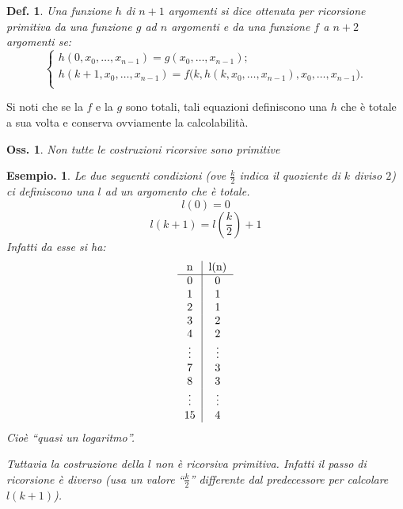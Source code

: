 \documentclass{book}
\newtheorem{definizione}{Def.}[chapter]
\newtheorem{osservazione}{Oss.}[chapter]
\newtheorem{esempio}{Esempio.}
\begin{document}
\begin{definizione}
Una funzione $h$ di $n + 1$ argomenti si dice ottenuta per \emph{ricorsione 
primitiva} da una funzione $g$ ad $n$ argomenti e da una funzione $f$ a $n + 2$
 argomenti se:
\[
\left\{ 
\begin{array}{l}
h(0, x_0, \ldots , x_{n-1}) = g(x_0, \ldots , x_{n-1});
 \\
h(k+1, x_0, \ldots , x_{n-1}) = f\bigl(k, h(k, x_0, \ldots , x_{n-1}),
x_0, \ldots , x_{n-1}\bigr). \\
\end{array} \right.
\]
\end{definizione}
Si noti che se la $f$ e la $g$ sono totali, tali equazioni definiscono una $h$
che \`e totale a sua volta e conserva ovviamente la calcolabilit\`a.

\begin{osservazione}
Non tutte le costruzioni ricorsive sono primitive
\end{osservazione}
\begin{esempio}
Le due seguenti condizioni (ove $\frac{k}{2}$ indica il quoziente di $k$ diviso
$2$) ci definiscono una $l$ ad un argomento che \`e totale.
\[l(0) = 0\]
\[l(k+1) = l\left(\frac{k}{2}\right) + 1\]
Infatti da esse si ha:
\[
\begin{tabular}{c|c}
n & l(n) \\
\hline
0 & 0 \\
1 & 1 \\
2 & 1 \\
3 & 2 \\
4 & 2 \\
\vdots & \vdots \\
7 & 3 \\
8 & 3 \\
\vdots & \vdots \\
15 & 4 \\
\end{tabular}
\]
Cio\`e ``quasi un logaritmo''.

Tuttavia la costruzione della $l$ \emph{non} \`e ricorsiva primitiva. Infatti 
il passo di ricorsione \`e diverso (usa un valore ``$\frac{k}{2}$'' differente 
dal  predecessore per calcolare $l(k+1)$).
\end{esempio}

\end{document}
